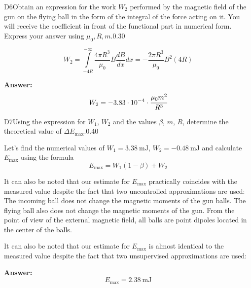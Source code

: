 \documentclass[11pt,a4paper]{article}
\begin{document}
\begin{solcard}{D6}{Obtain an expression for the work $W_2$ performed by the magnetic field of the gun on the flying ball in the form of the integral of the force acting on it. You will receive the coefficient in front of the functional part in numerical form. Express your answer using $\mu_0, R, m$.}{0.30}

\[ W_2 = \int\limits^{-\infty}_{-4R} \frac{4\pi R^3}{\mu_0 } B \frac{dB}{dx} dx = -\frac{2\pi R^3}{\mu_0} B^2(4R) \]

\par\smallskip\noindent\textbf{Answer:} \[ W_2 =  - 3.83 \cdot 10^{-4}  \cdot \cfrac{\mu_0 m^2}{R^3}\]
\end{solcard}

\begin{solcard}{D7}{Using the expression for $W_1$, $W_2$ and the values $\beta$, $m$, $R$, determine the theoretical value of $\Delta E_\mathrm{max}$.}{0.40}

Let's find the numerical values of $W_1 = 3.38~\mathrm{mJ}$, $W_2 = -0.48~\mathrm{mJ}$ and calculate $E_{\max}$ using the formula \[ E_{\max} = W_1 (1-\beta) + W_2\]


It can also be noted that our estimate for $E_{\max}$ practically coincides with the measured value despite the fact that two uncontrolled approximations are used: The incoming ball does not change the magnetic moments of the gun balls. The flying ball also does not change the magnetic moments of the gun. From the point of view of the external magnetic field, all balls are point dipoles located in the center of the balls.


It can also be noted that our estimate for $E_{\max}$ is almost identical to the measured value despite the fact that two unsupervised approximations are used:

\par\smallskip\noindent\textbf{Answer:} \[E_{\max}=2.38~\mathrm{mJ}\]
\end{solcard}
\end{document}
